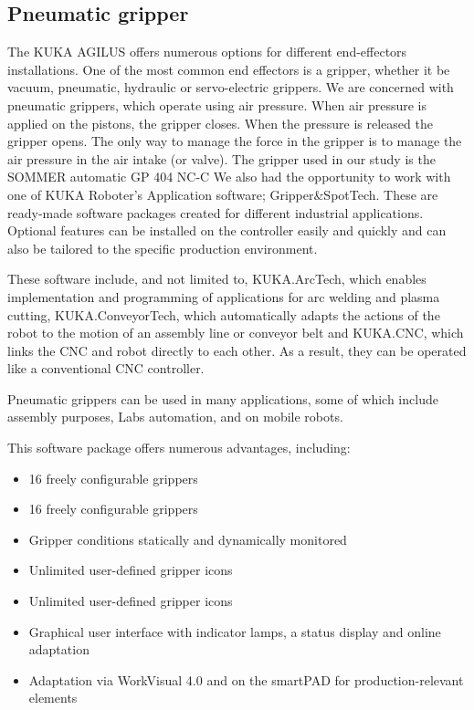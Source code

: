 	\subsection{Pneumatic gripper}
	The KUKA AGILUS offers numerous options for different end-effectors installations. One of the most common end effectors is a gripper, whether it be vacuum, pneumatic, hydraulic or servo-electric grippers. We are concerned with pneumatic grippers, which operate using air pressure. When air pressure is applied on the pistons, the gripper closes. When the pressure is released the gripper opens. The only way to manage the force in the gripper is to manage the air pressure in the air intake (or valve). The gripper used in our study is the SOMMER automatic GP 404 NC-C We also had the opportunity to work with one of KUKA Roboter’s Application software; Gripper\&SpotTech. These are ready-made software packages created for different industrial applications. Optional features can be installed on the controller easily and quickly and can also be tailored to the specific production environment. 
	
	These software include, and not limited to, KUKA.ArcTech, which enables implementation and programming of applications for arc welding and plasma cutting, KUKA.ConveyorTech, which automatically adapts the actions of the robot to the motion of an assembly line or conveyor belt and KUKA.CNC, which links the CNC and robot directly to each other. As a result, they can be operated like a conventional CNC controller.
	
	Pneumatic grippers can be used in many applications, some of which include assembly purposes, Labs automation, and on mobile robots.
	
	This software package offers numerous advantages, including:
		\begin{itemize}
			\item 16 freely configurable grippers
			\item 16 freely configurable grippers
			\item Gripper conditions statically and dynamically monitored
			\item Unlimited user-defined gripper icons
			\item Unlimited user-defined gripper icons
			\item Graphical user interface with indicator lamps, a status display and online adaptation
			\item Adaptation via WorkVisual 4.0 and on the smartPAD for production-relevant elements
		\end{itemize}

